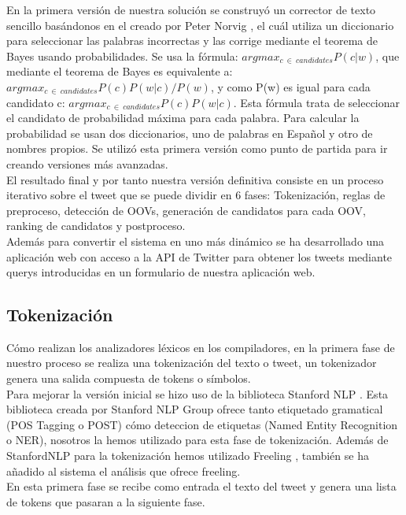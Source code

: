 \documentclass[spanish,12pt, a4paper,twoside]{paper}
\begin{document}
En la primera versión de nuestra solución se construyó un corrector de texto sencillo basándonos en el creado por Peter Norvig \cite{peternorvig}, el cuál utiliza un diccionario para seleccionar las palabras incorrectas y las corrige mediante el teorema de Bayes usando probabilidades. Se usa la fórmula: $argmax_{c\ \in\  candidates}P(c|w)$, que mediante el teorema de Bayes es equivalente a: $argmax_{c\ \in\  candidates}P(c) P(w|c) / P(w)$, y como P(w) es igual para cada candidato c: $argmax_{c\ \in\  candidates}P(c) P(w|c)$. Esta fórmula trata de seleccionar el candidato de probabilidad máxima para cada palabra. Para calcular la probabilidad se usan dos diccionarios, uno de palabras en Español y otro de nombres propios. Se utilizó esta primera versión como punto de partida para ir creando versiones más avanzadas.\\

El resultado final y por tanto nuestra versión definitiva consiste en un proceso iterativo sobre el tweet que se puede dividir en 6 fases: Tokenización, reglas de preproceso, detección de OOVs, generación de candidatos para cada OOV, ranking de candidatos y postproceso.\\

Además para convertir el sistema en uno más dinámico se ha desarrollado una aplicación web con acceso a la API de Twitter para obtener los tweets mediante querys introducidas en un formulario de nuestra aplicación web.

\subsection{Tokenización}\label{sec:tokenizacion}
Cómo realizan los analizadores léxicos en los compiladores, en la primera fase de nuestro proceso se realiza una tokenización del texto o tweet, un tokenizador genera una salida compuesta de tokens o símbolos.\\

Para mejorar la versión inicial se hizo uso de la biblioteca Stanford NLP \cite{stanfordnlp}. Esta biblioteca creada por Stanford NLP Group ofrece tanto etiquetado gramatical (POS Tagging o POST) cómo deteccion de etiquetas (Named Entity Recognition o NER), nosotros la hemos utilizado para esta fase de tokenización. Además de StanfordNLP para la tokenización hemos utilizado Freeling \cite{freeling}, también se ha añadido al sistema el análisis que ofrece freeling.\\

En esta primera fase se recibe como entrada el texto del tweet y genera una lista de tokens que pasaran a la siguiente fase.
\end{document}
